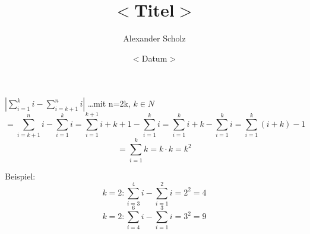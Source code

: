 \documentclass[12pt,a4paper]{article}
\title{\Huge\textbf{$<$Titel$>$}}
\author{Alexander Scholz}
\date{$<$Datum$>$}
\begin{document}
\begin{titlepage}

\maketitle
\thispagestyle{empty}
\end{titlepage}

$|\sum \limits_{i=1}^{k}i - \sum \limits_{i=k+1}^{n}i|$ …mit n=2k, $k\in N$\\
$$= \sum \limits_{i=k+1}^{n}i - \sum \limits_{i=1}^{k}i = \sum \limits_{i=1}^{k+1}i+k+1 - \sum \limits_{i=1}^{k}i = \sum \limits_{i=1}^{k}i+k - \sum \limits_{i=1}^{k}i = \sum \limits_{i=1}^{k} (i+k) -1$$
$$= \sum \limits_{i=1}^{k} k = k \cdot k = k^2$$

Beispiel:\\
$$k=2 : \sum \limits_{i=3}^{4} i - \sum \limits_{i=1}^{2} i= 2^2 = 4$$
$$k=2 : \sum \limits_{i=4}^{6} i - \sum \limits_{i=1}^{3} i= 3^2 = 9$$
\end{document}
